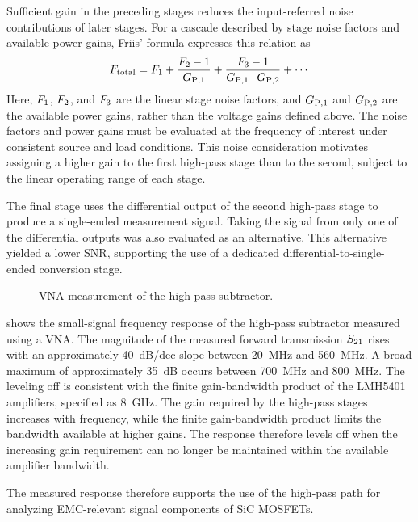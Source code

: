 Sufficient gain in the preceding stages reduces the input-referred noise contributions of later stages.
For a cascade described by stage noise factors and available power gains, Friis' formula expresses this relation as
\begin{equation}
	{F}_{\mathrm{total}} = {F}_{\mathrm{1}} + \frac{{F}_{\mathrm{2}}-1}{{G}_{\mathrm{P,1}}} + \frac{{F}_{\mathrm{3}}-1}{{G}_{\mathrm{P,1}}\cdot{G}_{\mathrm{P,2}}} + \cdots
\end{equation}
Here, ${F}_{\mathrm{1}}$, ${F}_{\mathrm{2}}$, and ${F}_{\mathrm{3}}$ are the linear stage noise factors, and ${G}_{\mathrm{P,1}}$ and ${G}_{\mathrm{P,2}}$ are the available power gains, rather than the voltage gains defined above.
The noise factors and power gains must be evaluated at the frequency of interest under consistent source and load conditions.
This noise consideration motivates assigning a higher gain to the first high-pass stage than to the second, subject to the linear operating range of each stage.

The final stage uses the differential output of the second high-pass stage to produce a single-ended measurement signal.
Taking the signal from only one of the differential outputs was also evaluated as an alternative.
This alternative yielded a lower SNR, supporting the use of a dedicated differential-to-single-ended conversion stage.

\begin{figure}[ht]
	\centering
	
	\caption{VNA measurement of the high-pass subtractor.}\label{fig:VNA_rawHP}
\end{figure}

 shows the small-signal frequency response of the high-pass subtractor measured using a VNA.
The magnitude of the measured forward transmission ${S}_{\mathrm{21}}$ rises with an approximately \SI{+40}{dB/dec} slope between \SI{20}{MHz} and \SI{560}{MHz}.
A broad maximum of approximately \SI{35}{dB} occurs between \SI{700}{MHz} and \SI{800}{MHz}.
The leveling off is consistent with the finite gain-bandwidth product of the LMH5401 amplifiers, specified as \SI{8}{GHz}.
The gain required by the high-pass stages increases with frequency, while the finite gain-bandwidth product limits the bandwidth available at higher gains.
The response therefore levels off when the increasing gain requirement can no longer be maintained within the available amplifier bandwidth.

The measured response therefore supports the use of the high-pass path for analyzing EMC-relevant signal components of SiC MOSFETs.

